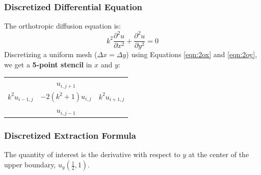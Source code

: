 \documentclass[10pt]{article}		%
\numberwithin{equation}{section}
\newcommand{\psder}[2]{\dfrac{\partial^2#1}{\partial#2^2}}		%
\begin{document}
\subsubsection{Discretized Differential Equation}

The orthotropic diffusion equation is:
\begin{equation}
k^2 \psder{u}{x} + \psder{u}{y} = 0
\end{equation}
Discretizing a uniform mesh ($\Delta x = \Delta y$) using Equations \ref{eqn:2ox} and \ref{eqn:2oy}, we get a \textbf{5-point stencil} in $x$ and $y$:

\begin{table}[H]
	\begin{tabular}{ccc}
		 & $u_{i, j+1}$ &  \\
		$k^2u_{i-1, j}$ & $-2(k^2+1)u_{i, j}$ & $k^2u_{i+1, j}$ \\
		 & $u_{i, j-1}$ & 
	\end{tabular}
\end{table}

\subsubsection{Discretized Extraction Formula}

The quantity of interest is the derivative with respect to $y$ at the center of the upper boundary, $u_y(\tfrac{1}{2}, 1)$.
\end{document}

